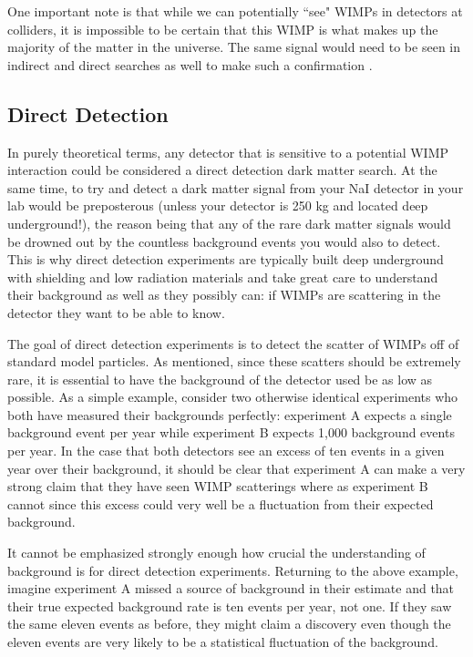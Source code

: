 One important note is that while we can potentially ``see" WIMPs in detectors at colliders,  it is impossible to be certain that this WIMP is what makes up the majority of the matter in the universe.  The same signal would need to be seen in indirect and direct searches as well to make such a confirmation \cite{queiroz2016dark}.


\subsection{Direct Detection}

In purely theoretical terms, any detector that is sensitive to a potential WIMP interaction could be considered a direct detection dark matter search.  At the same time, to try and detect a dark matter signal from your NaI detector in your lab would be preposterous (unless your detector is 250 kg and located deep underground!), the reason being that any of the rare dark matter signals would be drowned out by the countless background events you would also to detect.  This is why direct detection experiments are typically built deep underground with shielding and low radiation materials and take great care to understand their background as well as they possibly can: if WIMPs are scattering in the detector they want to be able to know.

The goal of direct detection experiments is to detect the scatter of WIMPs off of standard model particles.  As mentioned, since these scatters should be extremely rare, it is essential to have the background of the detector used be as low as possible.  As a simple example, consider two otherwise identical experiments who both have measured their backgrounds perfectly: experiment A expects a single background event per year while experiment B expects 1,000 background events per year.  In the case that both detectors see an excess of ten events in a given year over their background, it should be clear that experiment A can make a very strong claim that they have seen WIMP scatterings where as experiment B cannot since this excess could very well be a fluctuation from their expected background.

It cannot be emphasized strongly enough how crucial the understanding of background is for direct detection experiments.  Returning to the above example, imagine experiment A missed a source of background in their estimate and that their true expected background rate is ten events per year, not one.  If they saw the same eleven events as before, they might claim a discovery even though the eleven events are very likely to be a statistical fluctuation of the background.


